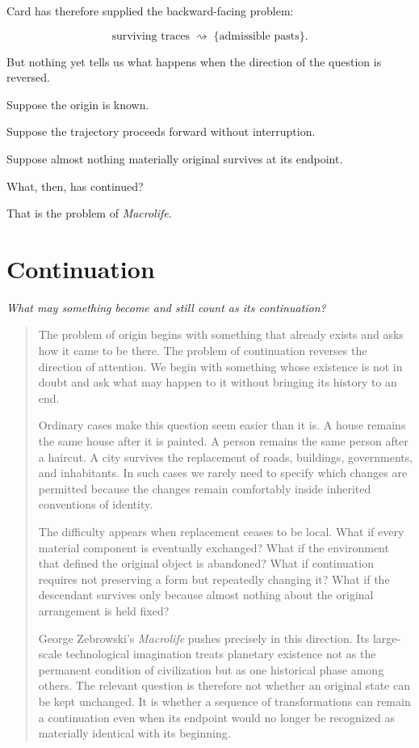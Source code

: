 \documentclass[
  11pt,
  a4paper,
  DIV=12,
  BCOR=0mm,
  parskip=half-
]{scrartcl}
\theoremstyle{definition}
\theoremstyle{plain}
\theoremstyle{remark}
\newcommand{\movementquestion}[1]{%
  \begin{center}
    \small\itshape
    #1
  \end{center}
  \medskip
}
\newenvironment{orientation}
  {%
    \begin{quote}
    \small
    \setlength{\parindent}{1em}
  }
  {%
    \end{quote}
  }
\begin{document}
Card has therefore supplied the backward-facing problem:

\[
  \boxed{
  \text{surviving traces}
  \;\rightsquigarrow\;
  \{\text{admissible pasts}\}
  }.
\]

But nothing yet tells us what happens when the direction of the question is
reversed.

Suppose the origin is known.

Suppose the trajectory proceeds forward without interruption.

Suppose almost nothing materially original survives at its endpoint.

What, then, has continued?

That is the problem of \emph{Macrolife}.


\section{Continuation}
\label{mov:continuation}

\movementquestion{What may something become and still count as its continuation?}

\begin{orientation}
The problem of origin begins with something that already exists and asks how
it came to be there. The problem of continuation reverses the direction of
attention. We begin with something whose existence is not in doubt and ask
what may happen to it without bringing its history to an end.

Ordinary cases make this question seem easier than it is. A house remains the
same house after it is painted. A person remains the same person after a
haircut. A city survives the replacement of roads, buildings, governments,
and inhabitants. In such cases we rarely need to specify which changes are
permitted because the changes remain comfortably inside inherited conventions
of identity.

The difficulty appears when replacement ceases to be local. What if every
material component is eventually exchanged? What if the environment that
defined the original object is abandoned? What if continuation requires not
preserving a form but repeatedly changing it? What if the descendant survives
only because almost nothing about the original arrangement is held fixed?

George Zebrowski's \emph{Macrolife} pushes precisely in this direction. Its
large-scale technological imagination treats planetary existence not as the
permanent condition of civilization but as one historical phase among others.
The relevant question is therefore not whether an original state can be kept
unchanged. It is whether a sequence of transformations can remain a
continuation even when its endpoint would no longer be recognized as materially
identical with its beginning.
\end{orientation}
\end{document}
